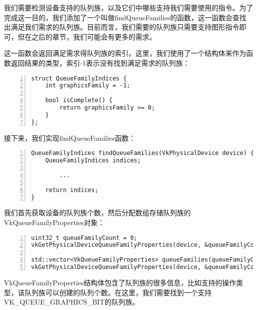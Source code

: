 \documentclass{ctexart}
\begin{document}
我们需要检测设备支持的队列族，以及它们中哪些支持我们需要使用的指令。为了完成这一目的，我们添加了一个叫做findQueueFamilies的函数，这一函数会查找出满足我们需求的队列族。目前而言，我们需要的队列族只需要支持图形指令即可，但在之后的章节，我们可能会有更多的需求。

这一函数会返回满足需求得队列族的索引。这里，我们使用了一个结构体来作为函数返回结果的类型，索引-1表示没有找到满足需求的队列族：

\begin{lstlisting}[language={[ANSI]C},keywordstyle=\color{blue!70},commentstyle=\color{red!50!green!50!blue!50},frame=shadowbox, rulesepcolor=\color{red!20!green!20!blue!20},basicstyle=\small,numbers=left, numberstyle=\tiny,breaklines=true]
struct QueueFamilyIndices {
	int graphicsFamily = -1;

	bool isComplete() {
		return graphicsFamily >= 0;
	}
};
\end{lstlisting}

接下来，我们实现findQueueFamilies函数：

\begin{lstlisting}[language={[ANSI]C},keywordstyle=\color{blue!70},commentstyle=\color{red!50!green!50!blue!50},frame=shadowbox, rulesepcolor=\color{red!20!green!20!blue!20},basicstyle=\small,numbers=left, numberstyle=\tiny,breaklines=true]
QueueFamilyIndices findQueueFamilies(VkPhysicalDevice device) {
	QueueFamilyIndices indices;

		...

	return indices;
}
\end{lstlisting}

我们首先获取设备的队列族个数，然后分配数组存储队列族的VkQueueFamilyProperties对象：

\begin{lstlisting}[language={[ANSI]C},keywordstyle=\color{blue!70},commentstyle=\color{red!50!green!50!blue!50},frame=shadowbox, rulesepcolor=\color{red!20!green!20!blue!20},basicstyle=\small,numbers=left, numberstyle=\tiny,breaklines=true]
uint32_t queueFamilyCount = 0;
vkGetPhysicalDeviceQueueFamilyProperties(device, &queueFamilyCount, nullptr);

std::vector<VkQueueFamilyProperties> queueFamilies(queueFamilyCount);
vkGetPhysicalDeviceQueueFamilyProperties(device, &queueFamilyCount, queueFamilies.data());
\end{lstlisting}

VkQueueFamilyProperties结构体包含了队列族的很多信息，比如支持的操作类型，该队列族可以创建的队列个数。在这里，我们需要找到一个支持VK\_QUEUE\_GRAPHICS\_BIT的队列族。
\end{document}
